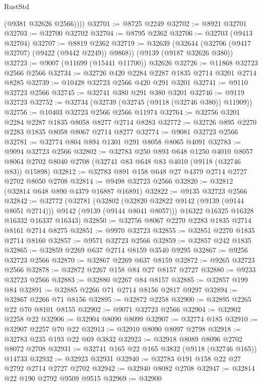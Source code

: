 \begin{lexlean}{RustStd}
\begin{coremodule}
          (@9381 @32626 @2566))))
@32701 := @8725 @2249
@32702 := @8921 @32701
@32703 := @32700 @32702
@32704 := @8795 @2362
@32706 := @32703 (@9413 @32704)
@32707 := @8819 @2362
@32719 := @32639
    (@32644 (@32706 (@9417 @32707) (@9422 (@9442 @2249)) @9868))
    (@9139 (@9187 @32626 @380))
@32723 := @9007 (@11699 (@15441 @11700)) @32626
@32726 := @11868 @32723 @2566 @2566
@32734 := @32726 @420 @2284 @2287 @1835 @2714 @3201 @2714 @8285
@32739 := @10428 @32723 @2566 @420 @291 @3201
@32741 := @9110 @32723 @2566
@32745 := @32741 @380 @291 @380 @3201
@32746 := @9119 @32723
@32752 := @32734 (@32739 (@32745 (@9118 (@32746 @380)) @11909))
@32756 := @10403 @32723 @2566 @2566 @11974
@32764 := @32756 @3201 @2284 @2287 @1835 @8058 @8277 @2714 @8283
@32772 := @32726 @895 @2270 @2283 @1835 @8058 @8067 @2714 @8277
@32774 := @9081 @32723 @2566
@32781 := @32774 @804 @894 @1301 @291 @8058 @8065 @4091
@32783 := @9094 @32723 @2566
@32802 := @32783
    @250
    @893
    @648
    @1250
    @4010
    @8057
    @8064
    @2702
    @8040
    @2708
    (@32741 @83 @648 @83 @4010 (@9118 (@32746 @83)) @15898)
@32812 := @32783 @891 @158 @648 @27 @4379 @2714 @2727 @2702 @8050 @2708
@32814 := @9498 @32723 @2566
@32820 := @32812 (@32814 @648 @890 @4379 @16887 @16891)
@32822 := @9135 @32723 @2566
@32842 := @32772
    (@32781
      (@32802 (@32820 @32822 @9142 (@9139 (@9144 @8051 @2714))) @9142 (@9139 (@9144 @8041 @8057)))
      @16322
      @16325
      @16328
      @16332
      @16337
      @16343)
@32850 := @32756 @8067 @2270 @2283 @1835 @2714 @8161 @2714 @8275
@32851 := @9970 @32723
@32855 := @32851 @2270 @1835 @2714 @8160
@32857 := @9571 @32723 @2566
@32859 := @32857 @242 @1835
@32865 := @32859 @2269 @637 @2714 @8159 @3540 @9295
@32867 := @9256 @32723 @2566
@32870 := @32867 @2269 @637 @8159
@32872 := @9265 @32723 @2566
@32878 := @32872 @2267 @158 @84 @27 @8157 @2727
@32880 := @9233 @32723 @2566
@32883 := @32880 @2267 @84 @8157
@32885 := @32857 @199 @84
@32891 := @32885 @2266 @71 @2714 @8156 @2817 @9297
@32894 := @32867 @2266 @71 @8156
@32895 := @32872 @2258
@32900 := @32895 @2265 @22 @70 @8101 @8155
@32902 := @9071 @32723 @2566
@32904 := @32902 @2258 @22
@32906 := @32904 @8090 @8099
@32907 := @32774 @185
@32910 := @32907 @2257 @70 @22
@32913 := @32910 @8090 @8097 @2798
@32918 := @32783 @235 @193 @22 @69 @3832
@32923 := @32918 @8089 @8096 @2702 @8072 @2708
@32931 := @32741 @165 @22 @165 @3832 (@9118 (@32746 @165)) @14733
@32932 := @32923 @32931
@32940 := @32783 @191 @158 @22 @27 @2792 @2714 @2727 @2702
@32942 := @32940 @8082 @2708
@32947 := @32814 @22 @190 @2792 @9509 @9515
@32969 := @32900

\end{coremodule}
\end{lexlean}
